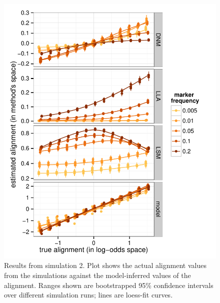\documentclass{acm_proc_article-sp}
\begin{document}
\begin{figure}[t]
\centering
\includegraphics[width=\columnwidth]{graphics/www2016_simulation2b_crossiter.pdf}
\caption{Results from simulation 2. Plot shows the actual alignment values from the simulations against the model-inferred values of the alignment. Ranges shown are bootstrapped 95\% confidence intervals over different simulation runs; lines are loess-fit curves.}\label{fig:sim2}
\end{figure}


\end{document}
